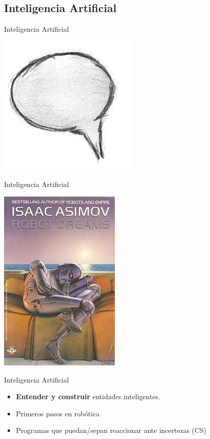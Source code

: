 \documentclass{beamer}
\begin{document}
\subsection{Inteligencia Artificial}
\begin{frame}{Inteligencia Artificial}
    \begin{center}
        \includegraphics[width=0.4\linewidth]{Images/comment}
    \end{center}
\end{frame}


\begin{frame}{Inteligencia Artificial}
    \begin{center}
        \includegraphics[width=0.4\linewidth]{Images/RobotDreams}
    \end{center}
\end{frame}

\begin{frame}{Inteligencia Artificial}
    \begin{itemize}
        \item \textbf{Entender y construir} entidades 
        inteligentes.
        \item Primeros pasos en robótica
        \item Programas que puedan/sepan reaccionar ante incertezas (CS)
    \end{itemize}
\end{frame}
\end{document}
